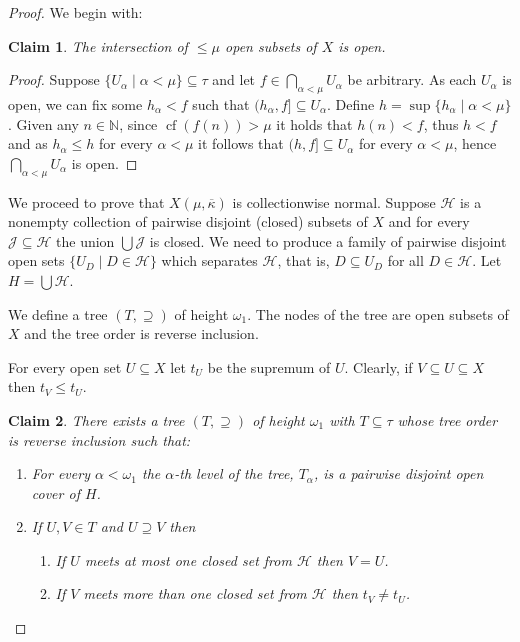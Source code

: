 \documentclass{amsart}
\newtheorem{claim}{Claim}[theorem]
\theoremstyle{remark}
\DeclareMathOperator{\cf}{cf}
\renewcommand\mid{\mathrel{|}\allowbreak}
\begin{document}
\begin{proof} We begin with:
\begin{claim}
    The intersection of \(\le \mu\) open subsets of $X$ is open.
\end{claim}

\begin{proof}
    Suppose \(\{U_\alpha\mid \alpha<\mu \}\subseteq \tau\) and let \(f\in \bigcap_{\alpha<\mu}U_\alpha\) be arbitrary.
    As each \(U_\alpha\) is open, we can fix some \(h_\alpha<f\) such that \((h_\alpha,f]\subseteq U_\alpha\). Define
    \(h=\sup\{h_\alpha\mid \alpha<\mu\}\). Given  any \(n\in \mathbb N\), since \(\cf(f(n))>\mu\) it holds that
    \(h(n)<f\), thus \(h<f\) and as \(h_\alpha\le h\) for every \(\alpha<\mu\) it follows that \((h,f]\subseteq U_\alpha\) for every \(\alpha<\mu\), hence \(\bigcap_{\alpha<\mu}U_\alpha\) is open.
\end{proof}

    We proceed to prove that \(X(\mu,\overline \kappa)\) is collectionwise normal.
   Suppose \(\mathcal H\) is a nonempty collection of pairwise disjoint (closed) subsets of \(X\)
   and for every $\mathcal J\subseteq \mathcal H$ the union \(\bigcup \mathcal J\) is closed.
   We need to produce a family of pairwise disjoint open sets
   \(\{U_D\mid D\in \mathcal H\}\) which separates \(\mathcal H\), that is,
   \(D\subseteq U_{D}\) for all \(D\in \mathcal H\).
   Let \(H=\bigcup \mathcal H\).

   We define  a tree \((T,\supseteq)\) of height \(\omega_{1}\). The nodes of the tree are
   open subsets of \(X\) and the tree order is reverse inclusion.

   For every open set \(U\subseteq X\) let \(t_{U}\) be the supremum of \(U\). Clearly, if
   \(V\subseteq U\subseteq X\) then \(t_{V}\le t_{U}\).

   \begin{claim}
There exists a tree \((T,\supseteq)\) of height \(\omega_{1}\)  with \(T\subseteq\tau\) whose tree order is reverse inclusion such that:
   \begin{enumerate}
           \item For every \(\alpha <\omega_{1}\) the \(\alpha\)-th level of the tree,
           \(T_{\alpha}\), is a pairwise disjoint open cover of \(H\).
     \item If \(U,V\in T\) and \(U\supseteq V\) then
           \begin{enumerate}
                   \item If \(U\) meets at most one closed set from
                   \(\mathcal H\) then \(V=U\).
                   \item If \(V\) meets more than one closed set from                   \(\mathcal H\)
                   then
                   \(t_{V}\not=t_{U}\).
           \end{enumerate}
           \end{enumerate}
\end{claim}


\end{proof}
\end{document}
